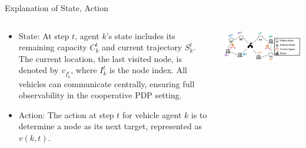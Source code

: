 \documentclass{beamer}
\begin{document}
\begin{frame}{Explanation of State, Action}
	\begin{columns}
		\begin{column}{0.4\textwidth}
			\begin{itemize}
				\small
				\item State: At step $t$, agent $k$'s state includes its remaining capacity $C_k^t$ and current trajectory $S_k^t$. The current location, the last visited node, is denoted by $v_{I_k^t}$, where $I_k^t$ is the node index. All vehicles can communicate centrally, ensuring full observability in the cooperative PDP setting.
				\item Action: The action at step $t$ for vehicle agent $k$ is to determine a node as its next target, represented as $v(k,t).$
			\end{itemize}
		\end{column}
		\begin{column}{0.6\textwidth}
			\centering
			\includegraphics[width=\textwidth]{show.png} %
		\end{column}
	\end{columns}
\end{frame}
\end{document}
